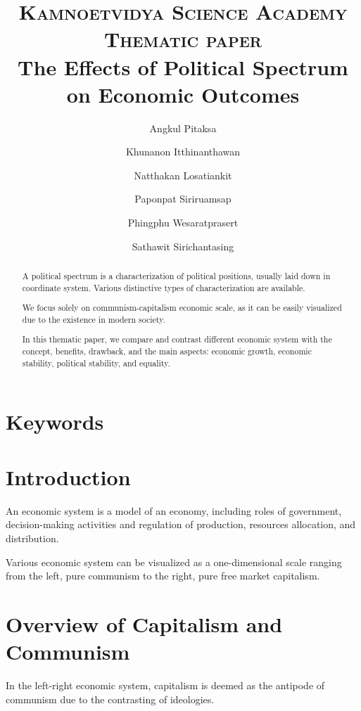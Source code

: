\documentclass[12pt,twocolumn,a4paper]{article}
\title{
\usefont{OT1}{bch}{b}{n}
\normalfont \normalsize \textsc{Kamnoetvidya Science Academy Thematic paper} \\ [14pt]
\LARGE The Effects of Political Spectrum on Economic Outcomes\\
}
\author[1]{Angkul Pitaksa}
\author[1]{Khunanon Itthinanthawan}
\author[1]{Natthakan Losatiankit}
\author[1]{Paponpat Siriruamsap}
\author[1]{Phingphu Wesaratprasert}
\author[1]{Sathawit Sirichantasing}
\affil[1]{\small{SO30102, Kamnoetvidya Science Academy}}
\begin{document}
\maketitle

\begin{abstract}
A political spectrum is a characterization of political positions, usually laid down in coordinate system. Various distinctive types of characterization are available.

We focus solely on communism-capitalism economic scale, as it can be easily visualized due to the existence in modern society.

In this thematic paper, we compare and contrast different economic system with the concept, benefits, drawback, and the main aspects: economic growth, economic stability, political stability, and equality.
\end{abstract} 

\section*{Keywords}


\section{Introduction}
An economic system is a model of an economy, including roles of government, decision-making activities and regulation of production, resources allocation, and distribution.

Various economic system can be visualized as a one-dimensional scale ranging from the left, pure communism to the right, pure free market capitalism. 

\section{Overview of Capitalism and Communism}
In the left-right economic system, capitalism is deemed as the antipode of communism due to the contrasting of ideologies.
\end{document}
